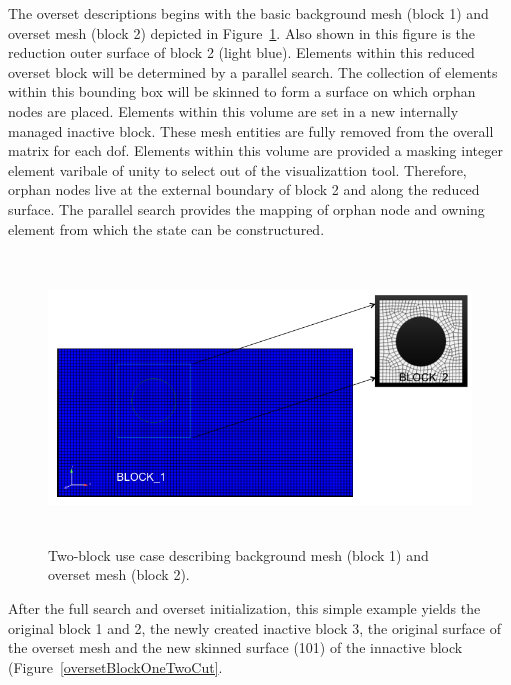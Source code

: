 The overset descriptions begins with the basic background mesh (block 1) and
overset mesh (block 2) depicted in Figure~\ref{oversetBlockOneTwo}. Also
shown in this figure is the reduction outer surface of block 2 (light blue).
Elements within this reduced overset block will be determined by a parallel 
search. The collection of elements within this bounding box will be skinned 
to form a surface on which orphan nodes are placed. Elements within this volume
are set in a new internally managed inactive block. These mesh entities are 
fully removed from the overall matrix for each dof. Elements within this
volume are provided a masking integer element varibale of unity to select
out of the visualizattion tool. Therefore, orphan nodes live at the external 
boundary of block 2 and along the reduced surface. The parallel search provides
the mapping of orphan node and owning element from which the state can be 
constructured.

\begin{figure} [h]
\centerline{\includegraphics[height=3.0in]{images/oversetBlockOneTwo}}
\vspace{0.1in}
\caption{Two-block use case describing background mesh (block 1) and 
overset mesh (block 2).}
\label{oversetBlockOneTwo}
\end{figure}

After the full search and overset initialization, this simple example yields
the original block 1 and 2, the newly created inactive block 3, the original
surface of the overset mesh and the new skinned surface (101) of the innactive
block (Figure~\ref{oversetBlockOneTwoCut}.

